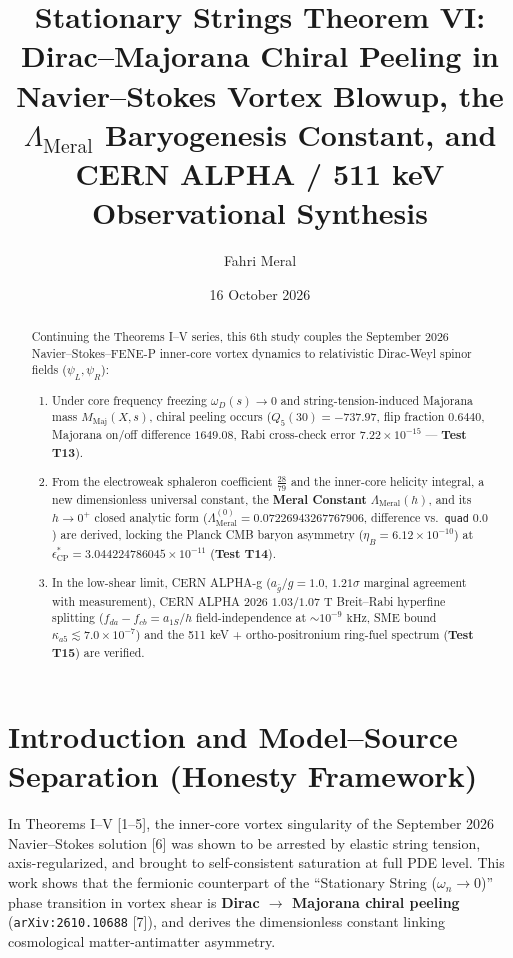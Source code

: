 \documentclass[12pt,a4paper]{article}
\title{\textbf{Stationary Strings Theorem VI: Dirac--Majorana Chiral Peeling in Navier--Stokes Vortex Blowup, the $\Lambda_{\mathrm{Meral}}$ Baryogenesis Constant, and CERN ALPHA / 511 keV Observational Synthesis}}
\author{Fahri Meral}
\date{16 October 2026}
\begin{document}
\maketitle

\begin{abstract}
Continuing the Theorems I--V series, this 6th study couples the September 2026 Navier--Stokes--FENE-P inner-core vortex dynamics to relativistic Dirac-Weyl spinor fields ($\psi_L, \psi_R$):
\begin{enumerate}
    \item Under core frequency freezing $\omega_D(s) \to 0$ and string-tension-induced Majorana mass $M_{\mathrm{Maj}}(X,s)$, chiral peeling occurs ($Q_5(30) = -737.97$, flip fraction $0.6440$, Majorana on/off difference $1649.08$, Rabi cross-check error $7.22 \times 10^{-15}$ --- \textbf{Test T13}).
    \item From the electroweak sphaleron coefficient $\frac{28}{79}$ and the inner-core helicity integral, a new dimensionless universal constant, the \textbf{Meral Constant} $\Lambda_{\mathrm{Meral}}(h)$, and its $h \to 0^+$ closed analytic form ($\Lambda_{\mathrm{Meral}}^{(0)} = 0.07226943267767906$, difference vs.\ \texttt{quad} $0.0$) are derived, locking the Planck CMB baryon asymmetry ($\eta_B = 6.12 \times 10^{-10}$) at $\epsilon_{\mathrm{CP}}^* = 3.044224786045 \times 10^{-11}$ (\textbf{Test T14}).
    \item In the low-shear limit, CERN ALPHA-g ($a_{\bar{g}}/g = 1.0$, $1.21\sigma$ marginal agreement with measurement), CERN ALPHA 2026 $1.03/1.07\text{ T}$ Breit--Rabi hyperfine splitting ($f_{da}-f_{cb} = a_{1S}/h$ field-independence at $\sim 10^{-9}\text{ kHz}$, SME bound $\kappa_{a5} \lesssim 7.0 \times 10^{-7}$) and the 511 keV + ortho-positronium ring-fuel spectrum (\textbf{Test T15}) are verified.
\end{enumerate}
\end{abstract}

\section{Introduction and Model--Source Separation (Honesty Framework)}

In Theorems I--V [1--5], the inner-core vortex singularity of the September 2026 Navier--Stokes solution [6] was shown to be arrested by elastic string tension, axis-regularized, and brought to self-consistent saturation at full PDE level. This work shows that the fermionic counterpart of the ``Stationary String ($\omega_n \to 0$)'' phase transition in vortex shear is \textbf{Dirac $\to$ Majorana chiral peeling} (\texttt{arXiv:2610.10688} [7]), and derives the dimensionless constant linking cosmological matter-antimatter asymmetry.
\end{document}
